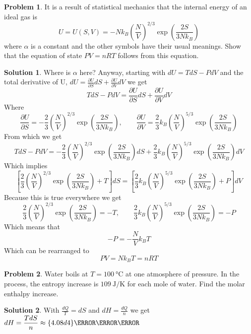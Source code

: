 \documentclass[10pt]{article}
\theoremstyle{definition}
\newtheorem{problem}{Problem}
\newtheorem{soln}{Solution}
\begin{document}
\begin{problem}
It is a result of statistical mechanics that the internal energy of an ideal gas is
$$U=U(S,V)=-Nk_B\left(\frac{N}{V}\right)^{2/3}\exp\left(\frac{2S}{3Nk_B}\right)$$
where $\alpha$ is a constant and the other symbols have their usual meanings.
Show that the equation of state $PV = nRT$ follows from this equation.
\end{problem}
\begin{soln}
  Where is $\alpha$ here? Anyway, starting with $dU=TdS-PdV$ and the total derivative of U, $dU=\frac{\partial U}{\partial S}dS+\frac{\partial U}{\partial V}dV$ we get
  $$TdS-PdV=\frac{\partial U}{\partial S}dS+\frac{\partial U}{\partial V}dV$$
  Where
  $$\frac{\partial U}{\partial S}=-\frac{2}{3}\left(\frac{N}{V}\right)^{2/3}\exp\left(\frac{2S}{3Nk_B}\right),
    \qquad\frac{\partial U}{\partial V}=\frac{2}{3}k_B\left(\frac{N}{V}\right)^{5/3}\exp\left(\frac{2S}{3Nk_B}\right)$$
  From which we get
  $$TdS-PdV=-\frac{2}{3}\left(\frac{N}{V}\right)^{2/3}\exp\left(\frac{2S}{3Nk_B}\right)dS+\frac{2}{3}k_B\left(\frac{N}{V}\right)^{5/3}\exp\left(\frac{2S}{3Nk_B}\right)dV$$
  Which implies
  $$\left[\frac{2}{3}\left(\frac{N}{V}\right)^{2/3}\exp\left(\frac{2S}{3Nk_B}\right)+T\right]dS=\left[\frac{2}{3}k_B\left(\frac{N}{V}\right)^{5/3}\exp\left(\frac{2S}{3Nk_B}\right)+P\right]dV$$
  Because this is true everywhere we get
  $$\frac{2}{3}\left(\frac{N}{V}\right)^{2/3}\exp\left(\frac{2S}{3Nk_B}\right)=-T,
    \qquad\frac{2}{3}k_B\left(\frac{N}{V}\right)^{5/3}\exp\left(\frac{2S}{3Nk_B}\right)=-P$$
  Which means that
  $$-P=-\frac{N}{V}k_BT$$
  Which can be rearranged to
  $$PV=Nk_BT=nRT$$
\end{soln}

\begin{problem}
Water boils at $T = \qty{100}{\degreeCelsius}$ at one atmosphere of pressure. In the process, the entropy increase is
$\qty{109}{\joule\per\kelvin}$ for each mole of water. Find the molar enthalpy increase.
\end{problem}
\begin{soln}
  With $\displaystyle\frac{dQ}{T}=dS$ and $\displaystyle dH=\frac{dQ}{n}$ we get $\displaystyle dH=\frac{TdS}{n}\approx\qty{4.08d4}{\joule\per\mole}$
\end{soln}
\end{document}
